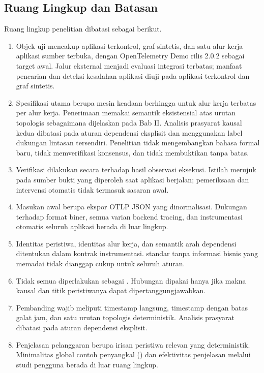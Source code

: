 \subsection{Ruang Lingkup dan Batasan}
Ruang lingkup penelitian dibatasi sebagai berikut.
\begin{enumerate}
  \item Objek uji mencakup aplikasi terkontrol, graf sintetis, dan satu alur kerja aplikasi sumber terbuka, dengan OpenTelemetry Demo rilis 2.0.2 sebagai target awal. Jalur eksternal menjadi evaluasi integrasi terbatas; manfaat pencarian dan deteksi kesalahan aplikasi diuji pada aplikasi terkontrol dan graf sintetis.
  \item Spesifikasi utama berupa mesin keadaan berhingga untuk alur kerja terbatas per alur kerja. Penerimaan memakai semantik eksistensial atas urutan topologis sebagaimana dijelaskan pada Bab II. Analisis prasyarat kausal kedua dibatasi pada aturan dependensi eksplisit dan menggunakan label dukungan lintasan tersendiri. Penelitian tidak mengembangkan bahasa formal baru, tidak memverifikasi konsensus, dan tidak membuktikan  tanpa batas.
  \item Verifikasi dilakukan secara  terhadap hasil observasi eksekusi. Istilah  merujuk pada sumber bukti yang diperoleh saat aplikasi berjalan; pemeriksaan  dan intervensi otomatis tidak termasuk sasaran awal.
  \item Masukan awal berupa ekspor OTLP JSON yang dinormalisasi. Dukungan terhadap format biner, semua varian backend tracing, dan instrumentasi otomatis seluruh aplikasi berada di luar lingkup.
  \item Identitas peristiwa, identitas alur kerja, dan semantik arah dependensi ditentukan dalam kontrak instrumentasi.  standar tanpa informasi bisnis yang memadai tidak dianggap cukup untuk seluruh aturan.
  \item Tidak semua  diperlakukan sebagai . Hubungan dipakai hanya jika makna kausal dan titik peristiwanya dapat dipertanggungjawabkan.
  \item Pembanding wajib meliputi timestamp langsung, timestamp dengan batas galat jam, dan satu urutan topologis deterministik. Analisis prasyarat dibatasi pada aturan dependensi eksplisit.
  \item Penjelasan pelanggaran berupa irisan peristiwa relevan yang deterministik. Minimalitas global contoh penyangkal () dan efektivitas penjelasan melalui studi pengguna berada di luar ruang lingkup.
\end{enumerate}

